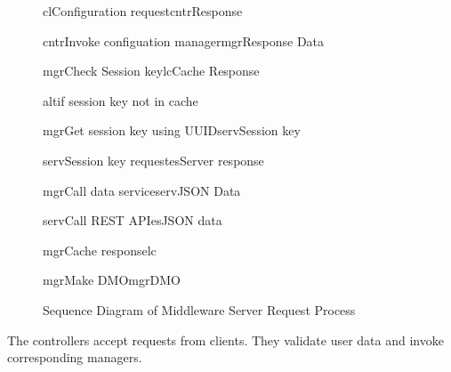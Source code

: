 \begin{figure}[h]
\begin{center}

	\resizebox{1.0\textwidth}{0.7\textwidth} {

	\begin{sequencediagram}

	\begin{call}{cl}{Configuration request}{cntr}{Response}

		\begin{call}{cntr}{Invoke configuation manager}{mgr}{Response Data}
			\begin{call}{mgr}{Check Session key}{lc}{Cache Response}\end{call}
			\begin{sdblock}{alt}{if session key not in cache}
				\begin{call}{mgr}{Get session key using UUID}{serv}{Session key}
					\begin{call}{serv}{Session key request}{es}{Server response}
					\end{call}
				\end{call}
			\end{sdblock}
			\begin{call}{mgr}{Call data service}{serv}{JSON Data}
				\begin{call}{serv}{Call REST API}{es}{JSON data}
				\end{call}
			\end{call}
			\begin{call}{mgr}{Cache response}{lc}{}
			\end{call}
			\begin{call}{mgr}{Make DMO}{mgr}{DMO}\end{call}
		\end{call}

	\end{call}

	\end{sequencediagram}
	}

\end{center}
\caption{Sequence Diagram of Middleware Server Request Process}
\label{fig:ms_req}
\end{figure}

The controllers accept requests from clients. They validate user data and invoke corresponding managers.

